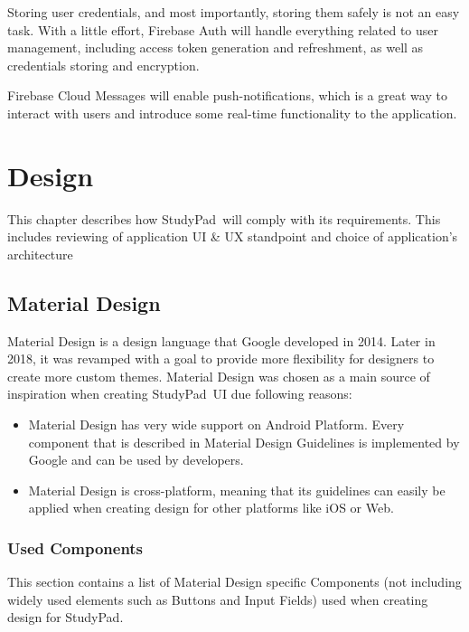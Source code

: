 \documentclass[thesis=B,english]{FITthesis}[2012/10/20]
\newcommand{\appname}{StudyPad}
\begin{document}
Storing user credentials, and most importantly, storing them safely is not an easy task. With a little effort, Firebase Auth will handle everything related to user management, including access token generation and refreshment, as well as credentials storing and encryption.

Firebase Cloud Messages will enable push-notifications, which is a great way to interact with users and introduce some real-time functionality to the application. 

	
\chapter{Design}

This chapter describes how \appname\ will comply with its requirements. This includes reviewing of application UI \& UX standpoint and choice of application's architecture

\section{Material Design}
Material Design is a design language that Google developed in 2014. Later in 2018, it was revamped with a goal to provide more flexibility for designers to create more custom themes. Material Design was chosen as a main source of inspiration when creating \appname\ UI due following  reasons:
\begin{itemize}
	\item Material Design has very wide support on Android Platform. Every component that is described in Material Design Guidelines is implemented by Google and can be used by developers.
	\item Material Design is cross-platform, meaning that its guidelines can easily be applied when creating design for other platforms like iOS or Web.
\end{itemize}



\subsection{Used Components}
This section contains a list of Material Design specific Components (not including widely used elements such as Buttons and Input Fields) used when creating design for \appname.
\end{document}
